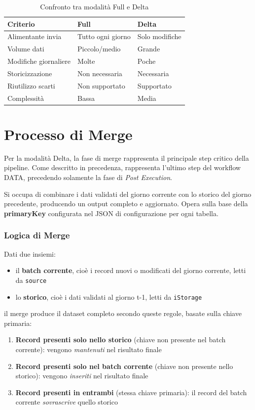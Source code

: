 \documentclass[12pt,a4paper,openright,twoside]{book}
\begin{document}
\begin{table}[H]
\centering\small
\begin{tabularx}{\textwidth}{X X X}
\toprule
\textbf{Criterio} & \textbf{Full} & \textbf{Delta} \\
\midrule
Alimentante invia      & Tutto ogni giorno & Solo modifiche \\[4pt]
Volume dati            & Piccolo/medio     & Grande \\[4pt]
Modifiche giornaliere  & Molte             & Poche \\[4pt]
Storicizzazione        & Non necessaria    & Necessaria \\[4pt]
Riutilizzo scarti      & Non supportato    & Supportato \\[4pt]
Complessità            & Bassa             & Media \\
\bottomrule
\end{tabularx}
\caption{Confronto tra modalità Full e Delta}
\label{tab:full-vs-delta}
\end{table}

\section{Processo di Merge}
Per la modalità Delta, la fase di merge rappresenta il principale step critico della pipeline.
Come descritto in precedenza, rappresenta l'ultimo step del workflow DATA, precedendo solamente la fase di \textit{Post Execution}. 

Si occupa di combinare i dati validati del giorno corrente con lo storico del giorno precedente, producendo un output completo e aggiornato.
Opera sulla base della \textbf{primaryKey} configurata nel JSON di configurazione per ogni tabella.

\subsubsection{Logica di Merge}
Dati due insiemi:
\begin{itemize}
    \item il \textbf{batch corrente}, cioè i record nuovi o modificati del giorno corrente, letti da \texttt{source}
    \item lo \textbf{storico}, cioè i dati validati al giorno t-1, letti da \texttt{iStorage}
\end{itemize}
il merge produce il dataset completo secondo queste regole, basate sulla chiave primaria:
\begin{enumerate}
    \item \textbf{Record presenti solo nello storico} (chiave non presente nel batch corrente): vengono \textit{mantenuti} nel risultato finale
    \item \textbf{Record presenti solo nel batch corrente} (chiave non presente nello storico): vengono \textit{inseriti} nel risultato finale
    \item \textbf{Record presenti in entrambi} (stessa chiave primaria): il record del batch corrente \textit{sovrascrive} quello storico
\end{enumerate}
\end{document}
